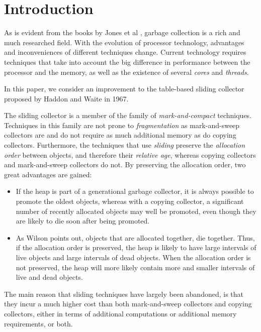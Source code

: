 \section{Introduction}

As is evident from the books by Jones et al
\cite{Jones:2011:GCH:2025255} \cite{Jones:1996:GCA:236254}, garbage
collection is a rich and much researched field.  With the evolution of
processor technology, advantages and inconveniences of different
techniques change.  Current technology requires techniques that take
into account the big difference in performance between the processor
and the memory, as well as the existence of several \emph{cores} and
\emph{threads}.

In this paper, we consider an improvement to the table-based sliding
collector proposed by Haddon and Waite \cite{Haddon:1967} in 1967.

The sliding collector is a member of the family of
\emph{mark-and-compact} techniques.  Techniques in this family are not
prone to \emph{fragmentation} as mark-and-sweep collectors are and do
not require as much additional memory as do copying collectors.
Furthermore, the techniques that use \emph{sliding} preserve the
\emph{allocation order} between objects, and therefore their
\emph{relative age}, whereas copying collectors and mark-and-sweep
collectors do not.  By preserving the allocation order, two great
advantages are gained:

\begin{itemize}
\item If the heap is part of a generational garbage collector, it is
  always possible to promote the oldest objects, whereas with a
  copying collector, a significant number of recently allocated 
  objects may well be promoted, even though they are likely to die
  soon after being promoted. 
\item As Wilson \cite{Wilson:1992:UGC:645648.664824} points out,
  objects that are allocated together, die together.  Thus, if the
  allocation order is preserved, the heap is likely to have
  large intervals of live objects and large intervals of dead
  objects.  When the allocation order is not preserved, the heap will
  more likely contain more and smaller intervals of live and dead
  objects. 
\end{itemize}

The main reason that sliding techniques have largely been abandoned,
is that they incur a much higher cost than both mark-and-sweep
collectors and copying collectors, either in terms of additional
computations or additional memory requirements, or both. 
